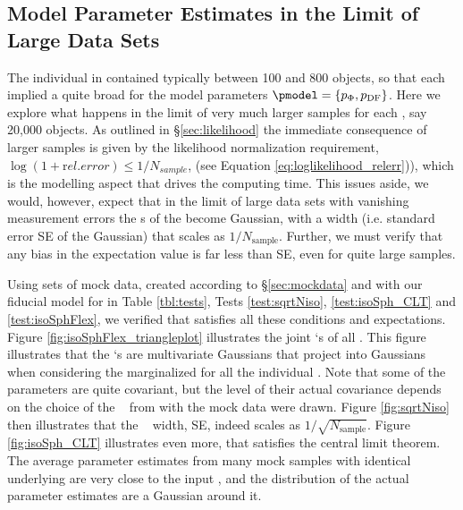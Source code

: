 \subsection{Model Parameter Estimates in the Limit of Large Data Sets} \label{sec:largedata}

The individual \MAP{} in \citet{bov13} contained typically between 100 and 800 objects, so that each \MAP{} implied a quite broad \pdf for the model parameters $\pmodel=\{p_\Phi,p_\text{DF}\}$. Here we explore what happens in the limit of very much larger samples for each \MAP{}, say 20,000 objects. As outlined in \S\ref{sec:likelihood} the immediate consequence of larger samples is given by the likelihood normalization requirement, $\log(1+{\mathrm rel. error})\le 1/N_{sample}$, (see Equation \ref{eq:loglikelihood_relerr})), which is the modelling aspect that drives the computing time. This issues aside, we would, however, expect that in the limit of large data sets with vanishing measurement errors the \pdf s of the \pmodel become Gaussian, with a \pdf width (i.e. standard error SE of the Gaussian) that scales as $1/N_\text{sample}$. Further, we must verify that any bias in the \pdf expectation value is far less than SE, even for quite large samples.

Using sets of mock data, created according to \S\ref{sec:mockdata} and with our fiducial model for \pmodel in Table \ref{tbl:tests}, Tests \ref{test:sqrtNiso}, \ref{test:isoSph_CLT} and \ref{test:isoSphFlex}, we verified that \RM{} satisfies all these conditions and expectations. Figure \ref{fig:isoSphFlex_triangleplot} illustrates the joint \pdf `s of all \pmodel. This figure illustrates that the \pdf `s are multivariate Gaussians that project into Gaussians when considering the marginalized \pdf for all the individual \pmodel . Note that some of the parameters are quite covariant, but the level of their actual covariance depends on the choice of the \pmodel~ from with the mock data were drawn.  Figure \ref{fig:sqrtNiso} then illustrates that the \pdf~ width, SE, indeed scales as $1/\sqrt{N_\text{sample}}$. Figure \ref{fig:isoSph_CLT} illustrates even more, that \RM{} satisfies the central limit theorem. The average parameter estimates from many mock samples with identical underlying \pmodel are very close to the input \pmodel , and the distribution of the actual parameter estimates are a Gaussian around it. 



